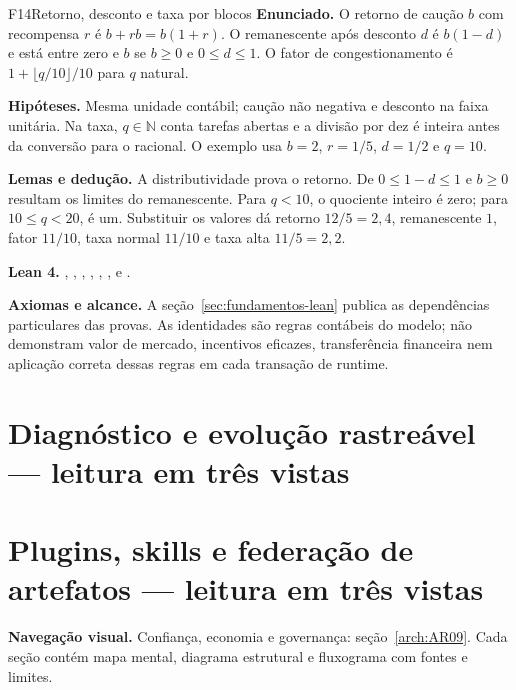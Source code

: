\begin{formalizacao}{F14}{Retorno, desconto e taxa por blocos}
\textbf{Enunciado.} O retorno de caução $b$ com recompensa $r$ é
$b+rb=b(1+r)$. O remanescente após desconto $d$ é $b(1-d)$ e está entre
zero e $b$ se $b\geq0$ e $0\leq d\leq1$. O fator de congestionamento é
$1+\lfloor q/10\rfloor/10$ para $q$ natural.

\textbf{Hipóteses.} Mesma unidade contábil; caução não negativa e desconto
na faixa unitária. Na taxa, $q\in\mathbb N$ conta tarefas abertas e a
divisão por dez é inteira antes da conversão para o racional. O exemplo
usa $b=2$, $r=1/5$, $d=1/2$ e $q=10$.

\textbf{Lemas e dedução.} A distributividade prova o retorno. De
$0\leq1-d\leq1$ e $b\geq0$ resultam os limites do remanescente.
Para $q<10$, o quociente inteiro é zero; para $10\leq q<20$, é um.
Substituir os valores dá retorno $12/5=2{,}4$, remanescente $1$,
fator $11/10$, taxa normal $11/10$ e taxa alta $11/5=2{,}2$.

\textbf{Lean 4.} ,
,
,
,
,
,
 e
.

\textbf{Axiomas e alcance.} A seção~\ref{sec:fundamentos-lean} publica
as dependências particulares das provas. As identidades são regras
contábeis do modelo; não demonstram valor de mercado, incentivos eficazes,
transferência financeira nem aplicação correta dessas regras em cada
transação de runtime.
\end{formalizacao}


\clearpage\section{Diagnóstico e evolução rastreável — leitura em três vistas}\label{arch:AR15}



\clearpage\section{Plugins, skills e federação de artefatos — leitura em três vistas}\label{arch:AR17}




\begin{descricao}\textbf{Navegação visual.} Confiança, economia e governança: seção~\ref{arch:AR09}. Cada seção contém mapa mental, diagrama estrutural e fluxograma com fontes e limites.\end{descricao}


